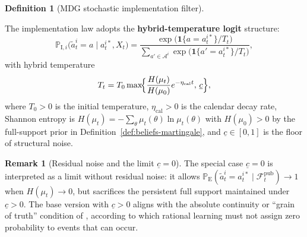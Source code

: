 \documentclass[ecta,nameyear,final,supplement]{econsocart}
\numberwithin{equation}{section}
\numberwithin{table}{section}
\theoremstyle{definition}
\newtheorem{definition}[theorem]{Definition}
\newtheorem{remark}[theorem]{Remark}
\newcommand{\ProbE}{\mathbb{P}_{\mathrm{E}}}
\newcommand{\ProbI}[1]{\mathbb{P}_{\mathrm{I},#1}}
\begin{document}
\begin{definition}[MDG stochastic implementation filter]
\begin{enumerate}
\end{enumerate}
The implementation law adopts the \textbf{hybrid-temperature logit}
structure:
\begin{equation}
\label{eq:logit-hybrid}
\ProbI{i}\bigl(\tilde{a}_t^i=a\mid a_t^{i\ast},X_t\bigr)
=\frac{\exp\bigl(\mathbf{1}\{a=a_t^{i\ast}\}/T_t\bigr)}
      {\sum_{a'\in\mathcal{A}^i}\exp\bigl(\mathbf{1}\{a'=a_t^{i\ast}\}/T_t\bigr)},
\end{equation}
with hybrid temperature
\begin{equation}
\label{eq:temperatura-piso}
T_t = T_0\max\!\Bigl\{\frac{H(\mu_t)}{H(\mu_0)}e^{-\eta_{\mathrm{cal}}t},\,\underline{c}\Bigr\},
\end{equation}
where $T_0>0$ is the initial temperature, $\eta_{\mathrm{cal}}>0$ is the
calendar decay rate, Shannon entropy is
$H(\mu_t)=-\sum_\theta\mu_t(\theta)\ln\mu_t(\theta)$ with
$H(\mu_0)>0$ by the full-support prior in
Definition~\ref{def:beliefs-martingale}, and
$\underline{c}\in[0,1]$ is the floor of structural noise.
\end{definition}

\begin{remark}[Residual noise and the limit $\underline{c}=0$]
\label{rem:mdg-floor}
The special case $\underline{c}=0$ is interpreted as a limit without residual
noise: it allows
$\ProbE(\tilde{a}_t^i=a_t^{i\ast}\mid\mathcal{F}_t^{\mathrm{pub}})\to 1$
when $H(\mu_t)\to 0$, but sacrifices the persistent full support maintained
under $\underline{c}>0$. The base version with $\underline{c}>0$ aligns with
the absolute continuity or ``grain of truth'' condition of
\citet{KalaiLehrer1993}, according to which rational learning must not assign
zero probability to events that can occur.
\end{remark}
\end{document}
